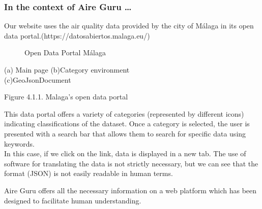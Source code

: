 \subsubsection*{In the context of Aire Guru \ldots} 

Our website uses the air quality data provided by the city of Málaga in its open data portal.(https://datosabiertos.malaga.eu/)\\

\begin{figure}[ht]
    \centering
    \hfill
    \vfill
    \caption{Open Data Portal Málaga}
\end{figure}


\begin{center}
    \bf{ (a) Main page     (b)Category environment\\
    (c)GeoJsonDocument
        
    Figure 4.1.1. Malaga's open data portal}
\end{center}

This data portal offers a variety of categories (represented by different icons) indicating classifications of the dataset.
Once a category is selected, the user is presented with a search bar that allows them to search for specific data using keywords.\\

In this case, if we click on the link, data is displayed in a new tab. The use of software
for translating the data is not strictly necessary, but we can see that the format (JSON) is not easily readable in human terms.

Aire Guru offers all the necessary information on a web platform which has been designed to facilitate human understanding.